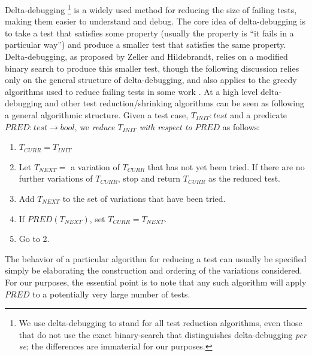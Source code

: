 Delta-debugging \cite{DD}\footnote{We use delta-debugging to stand for
  all test reduction algorithms, even those \cite{CReduce,tstl} that do not use the exact
  binary-search that distinguishes delta-debugging \emph{per se}; the
  differences are immaterial for our purposes.}  is a widely used method for reducing the
size of failing tests, making them easier to understand and debug.
The core idea of delta-debugging is to take a test that satisfies some
property (usually the property is ``it fails in a particular way'')
and produce a smaller test that satisfies the same property.
Delta-debugging, as proposed by Zeller and Hildebrandt, relies on a
modified binary search to produce this smaller test, though the
following discussion relies only on the general structure of
delta-debugging, and also applies to the greedy algorithms used to
reduce failing tests in some work \cite{CReduce,onetest}.  At a high
level delta-debugging and other test reduction/shrinking algorithms
can be seen as following a general algorithmic structure.  Given a
test case, $T_{\mathit{INIT}} : \mathit{test}$ and a predicate
$\mathit{PRED}: \mathit{test} \rightarrow \mathit{bool}$, we
\emph{reduce $T_{\mathit{INIT}}$ with respect to $\mathit{PRED}$} as follows:

\begin{enumerate}
\item $T_{\mathit{CURR}} = T_{\mathit{INIT}}$
\item Let $T_{\mathit{NEXT}} =$ a variation of $T_{\mathit{CURR}}$
  that has not yet been tried.  If there are no further variations of
  $T_{\mathit{CURR}}$, stop and return $T_{\mathit{CURR}}$ as the
  reduced test.
\item Add $T_{\mathit{NEXT}}$ to the set of variations that have been
  tried.
\item If $\mathit{PRED}(T_{\mathit{NEXT}})$, set $T_{\mathit{CURR}} =
  T_{\mathit{NEXT}}$.
\item Go to 2.
\end{enumerate}

The behavior of a particular algorithm for reducing a test can usually
be specified simply be elaborating the construction and ordering of
the variations considered.  For our purposes, the essential point is
to note that any such algorithm will apply $\mathit{PRED}$ to a
potentially very large number of tests.


